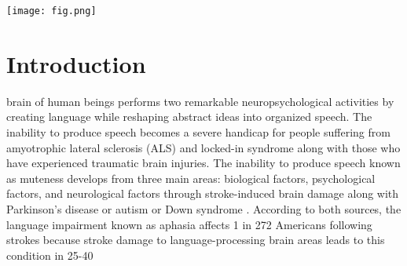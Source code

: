 \documentclass[journal]{IEEEtran}
\begin{document}
\IEEEpeerreviewmaketitle


\begin{center}
\end{center} \begin{figure*}[t]
\centering
\texttt{[image: fig.png]} %
\vspace{-10pt} %
\caption\normalsize{}
\label{fig:workflow}
\end{figure*}

\section{Introduction}

 brain of human beings performs two remarkable neuropsychological activities by creating language while reshaping abstract ideas into organized speech. The inability to produce speech becomes a severe handicap for people suffering from amyotrophic lateral sclerosis (ALS) and locked-in syndrome along with those who have experienced traumatic brain injuries. The inability to produce speech known as muteness develops from three main areas: biological factors, psychological factors, and neurological factors through stroke-induced brain damage along with Parkinson’s disease or autism or Down syndrome \cite{unknown-author-2022A, lyberg-ahlander-2018}. According to both sources, the language impairment known as aphasia affects 1 in 272 Americans following strokes because stroke damage to language-processing brain areas leads to this condition in 25-40%
\end{document}
